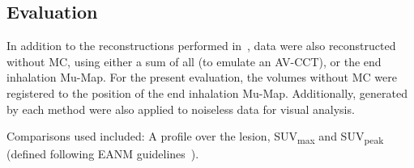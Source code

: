     
    \subsection{Evaluation} \label{sec:evaluation}
        In addition to the reconstructions performed in~, data were also reconstructed without \gls{MC}, using either a sum of all  (to emulate an \gls{AV-CCT}), or the end inhalation \gls{Mu-Map}. For the present evaluation, the volumes without \gls{MC} were registered to the position of the end inhalation \gls{Mu-Map}. Additionally,  generated by each method were also applied to noiseless data for visual analysis.
        
        Comparisons used included: A profile over the lesion, \gls{SUV}\textsubscript{max} and \gls{SUV}\textsubscript{peak} (defined following \gls{EANM} guidelines~\cite{Boellaard2015FDG2.0}).


